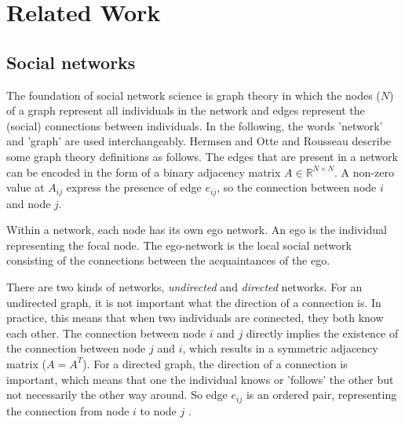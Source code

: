 \section{Related Work} \label{sec:rel}



\subsection{Social networks}
The foundation of social network science is graph theory in which the nodes ($N$) of a graph represent all individuals in the network and edges represent the (social) connections between individuals. In the following, the words 'network' and 'graph' are used interchangeably. Hermsen \cite{HermsenEndtoend} and Otte and Rousseau \cite{otte_social_2002} describe some graph theory definitions as follows. The edges that are present in a network can be encoded in the form of a binary adjacency matrix $A \in \mathbb{R}^{N\times N}$. A non-zero value at $A_{ij}$ express the presence of edge $e_{ij}$, so the connection between node $i$ and node $j$.

Within a network, each node has its own ego network. An ego is the individual representing the focal node. The ego-network is the local social network consisting of the connections between the acquaintances of the ego.

There are two kinds of networks, \textit{undirected} and \textit{directed} networks. For an undirected graph, it is not important what the direction of a connection is. In practice, this means that when two individuals are connected, they both know each other. The connection between node $i$ and $j$ directly implies the existence of the connection between node $j$ and $i$, which results in a symmetric adjacency matrix ($A = A^{T}$). For a directed graph, the direction of a connection is important, which means that one the individual knows or 'follows' the other but not necessarily the other way around. So edge $e_{ij}$ is an ordered pair, representing the connection from node $i$ to node $j$ .

